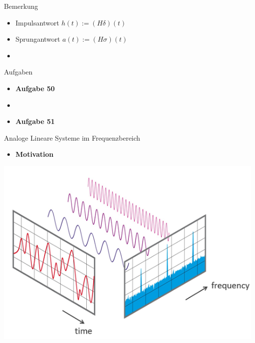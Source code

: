 \documentclass[14pt, aspectratio=169, handout]{beamer}
\begin{document}
\begin{frame}{Bemerkung}
    \begin{itemize}
        \item Impulsantwort $h(t) := (H \delta)(t)$
        \item Sprungantwort $a(t) := (H \sigma)(t)$
        \item[] 
    \end{itemize}
%
\end{frame}

\begin{frame}{Aufgaben}
    \begin{itemize}
        \item \textbf{Aufgabe 50}
        \item[] 
        \item \textbf{Aufgabe 51}
    \end{itemize}
\end{frame}

\begin{frame}{Analoge Lineare Systeme im Frequenzbereich}
\begin{itemize}
    \item \textbf{Motivation}
\end{itemize}
\begin{center}
     \includegraphics[width=0.65\linewidth]{figures/Zeit_und_Frequenzbereich.png}
\end{center} 
\end{frame}
\end{document}
